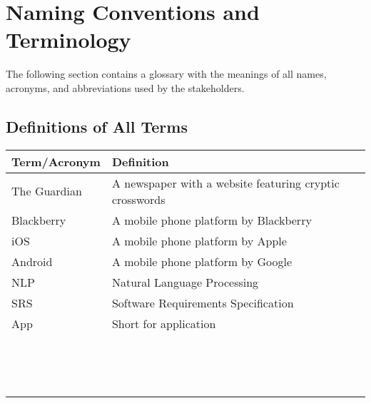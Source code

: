 \section{Naming Conventions and Terminology}

The following section contains a glossary with the meanings of all names, acronyms, and abbreviations used by the stakeholders.

\newpage
\subsection{Definitions of All Terms}

\begin{table}[H]
\centering
\small
    \begin{tabular}{|l|l|}
    \hline
    \textbf{Term/Acronym}  & \textbf{Definition}                                                \\ \hline
    The Guardian  &  A newspaper with a website featuring cryptic  crosswords \\ \hline
    Blackberry    & A mobile phone platform by Blackberry                     \\ \hline
    iOS           & A mobile phone platform by Apple                          \\ \hline
    Android       & A mobile phone platform by  Google                        \\ \hline
    NLP           & Natural Language Processing                               \\ \hline
    SRS           & Software Requirements Specification                       \\ \hline
    App           & Short for application                                     \\ \hline
    ~             & ~                                                         \\ \hline
    ~             & ~                                                         \\ \hline
    ~             & ~                                                         \\ \hline
    \end{tabular}
\end{table}

